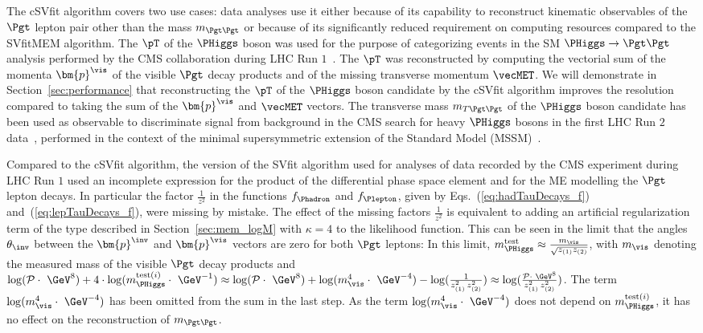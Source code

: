 The cSVfit algorithm covers two use cases:
data analyses use it either because of its capability to reconstruct kinematic observables of the $\Pgt$ lepton pair other than the mass $m_{\Pgt\Pgt}$
or because of its significantly reduced requirement on computing resources compared to the SVfitMEM algorithm.
The $\pT$ of the $\PHiggs$ boson was used for the purpose of categorizing events in the SM $\PHiggs \to \Pgt\Pgt$ analysis 
performed by the CMS collaboration during LHC Run $1$~\cite{HIG-13-004}.
The $\pT$ was reconstructed by computing the vectorial sum of the momenta $\bm{p}^{\vis}$ of the visible $\Pgt$ decay products and of the missing transverse momentum $\vecMET$.
We will demonstrate in Section~\ref{sec:performance} that reconstructing the $\pT$ of the $\PHiggs$ boson candidate by the cSVfit algorithm
improves the resolution compared to taking the sum of the $\bm{p}^{\vis}$ and $\vecMET$ vectors.
The transverse mass $m_{T\Pgt\Pgt}$ of the $\PHiggs$ boson candidate has been used as observable to discriminate signal from background
in the CMS search for heavy $\PHiggs$ bosons in the first LHC Run $2$ data~\cite{HIG-16-006}, 
performed in the context of the minimal supersymmetric extension of the Standard Model (MSSM)~\cite{Fayet:1974pd,Fayet:1977yc}.

Compared to the cSVfit algorithm,
the version of the SVfit algorithm used for analyses of data recorded by the CMS experiment during LHC Run $1$
used an incomplete expression for the product of the differential phase space element and for the ME modelling the $\Pgt$ lepton decays.
In particular the factor $\frac{1}{z^{2}}$ in the functions $f_{\Phadron}$ and $f_{\Plepton}$, 
given by Eqs.~(\ref{eq:hadTauDecays_f}) and~(\ref{eq:lepTauDecays_f}), were missing by mistake.
The effect of the missing factors $\frac{1}{z^{2}}$ 
is equivalent to adding an artificial regularization term of the type described in Section~\ref{sec:mem_logM} with $\kappa = 4$ to the likelihood function.
This can be seen in the limit that the angles $\theta_{\inv}$ between the $\bm{p}^{\inv}$ and $\bm{p}^{\vis}$ vectors are zero for both $\Pgt$ leptons:
In this limit, $m_{\PHiggs}^{\textrm{test}} \approx \frac{m_{\vis}}{\sqrt{z_{(1)}z_{(2)}}}$,
with $m_{\vis}$ denoting the measured mass of the visible $\Pgt$ decay products
and $\log(\mathcal{P} \cdot \textrm{~\GeV}^{8}) + 4 \cdot \log(m_{\PHiggs}^{\textrm{test}(i)} \cdot \textrm{~\GeV}^{-1}) \approx \log(\mathcal{P} \cdot \textrm{~\GeV}^{8}) + \log(m_{\vis}^{4} \cdot \textrm{~\GeV}^{-4}) - \log(\frac{1}{z_{(1)}^{2} \, z_{(2)}^{2}}) \approx \log(\frac{\mathcal{P} \cdot \textrm{~\GeV}^{8}}{z_{(1)}^{2} \, z_{(2)}^{2}})$.
The term $\log(m_{\vis}^{4} \cdot \textrm{~\GeV}^{-4})$ has been omitted from the sum in the last step.
As the term $\log(m_{\vis}^{4} \cdot \textrm{~\GeV}^{-4})$ does not depend on $m_{\PHiggs}^{\textrm{test}(i)}$,
it has no effect on the reconstruction of $m_{\Pgt\Pgt}$.
